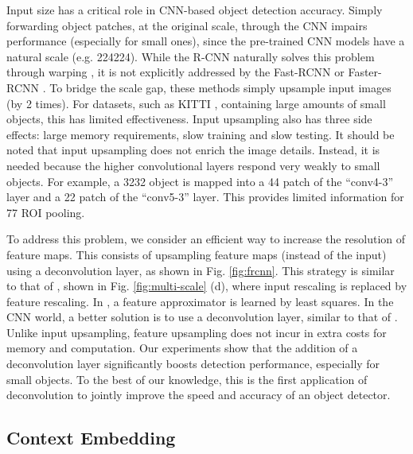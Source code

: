 \documentclass[runningheads]{llncs}
\begin{document}
Input size has a critical role in CNN-based object detection accuracy.
Simply forwarding object patches, at the original scale, through the CNN
impairs performance (especially for small ones), since the
pre-trained CNN models have a natural scale (e.g. 224224).
While the R-CNN naturally solves this problem through
warping \cite{DBLP:conf/cvpr/GirshickDDM14}, it is not explicitly
addressed by the Fast-RCNN \cite{DBLP:conf/iccv/Girshick15} or
Faster-RCNN \cite{DBLP:conf/nips/shaoqing15fasterRcnn}. To bridge
the scale gap, these methods simply upsample input images (by 2 times).
For datasets, such as KITTI \cite{DBLP:conf/cvpr/GeigerLU12}, containing
large amounts of small objects, this has limited effectiveness.
Input upsampling also has three side effects: large memory requirements, slow
training and slow testing. It should be noted that input upsampling does not
enrich the image details. Instead, it is needed because
the higher convolutional layers respond very weakly to small objects.
For example, a 3232 object is mapped into a 44
patch of the ``conv4-3'' layer and a 22 patch of the ``conv5-3''
layer. This provides limited information for 77
ROI pooling.

To address this problem, we consider an efficient
way to increase the resolution of feature maps. This consists of upsampling
feature maps (instead of the input) using a deconvolution layer,
as shown in Fig. \ref{fig:frcnn}. This strategy is similar to
that of \cite{DBLP:journals/pami/DollarABP14}, shown in Fig.
\ref{fig:multi-scale} (d), where input rescaling is replaced by feature
rescaling. In \cite{DBLP:journals/pami/DollarABP14}, a feature approximator
is learned by least squares. In the CNN world, a better solution is
to use a deconvolution layer, similar to that of
\cite{DBLP:conf/cvpr/LongSD15}. Unlike input upsampling, feature upsampling
does not incur in extra costs for memory and computation. Our
experiments show that the addition of a deconvolution layer significantly
boosts detection performance, especially for small objects.
To the best of our knowledge, this is the first application of deconvolution to jointly improve the speed and accuracy of an object detector.



\subsection{Context Embedding}
\label{subsec:context}
\end{document}

